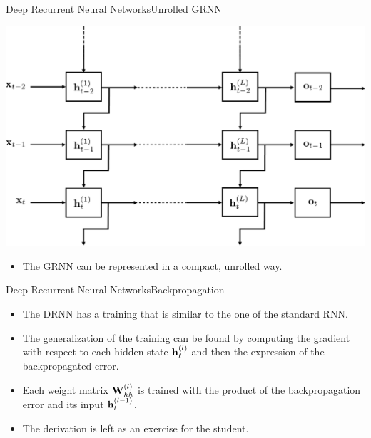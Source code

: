 \documentclass{beamer}
\begin{document}
\begin{frame}{Deep Recurrent Neural Networks}{Unrolled GRNN}
\begin{center}
\includegraphics[scale=0.4]{Module 5 (RNN)/pics/smaller_drnn_unrolled.pdf}
\end{center}
\begin{itemize}
\item The GRNN can be represented in a compact, unrolled way.
\end{itemize}
\end{frame}
\begin{frame}{Deep Recurrent Neural Networks}{Backpropagation}
\begin{itemize}
\item The DRNN has a training that is similar to the one of the standard RNN.
\item The generalization of the training can be found by computing the gradient with respect to each hidden state ${\bf h}^{(l)}_{t}$ and then the expression of the backpropagated error.  
\item Each weight matrix ${\bf W}_{hh}^{(l)}$ is trained with the product of the backpropagation error and its input ${\bf h}^{(l-1)}_t$.
\item The derivation is left as an exercise for the student.
\end{itemize}
\begin{center}
\end{center}
\end{frame}
\end{document}

